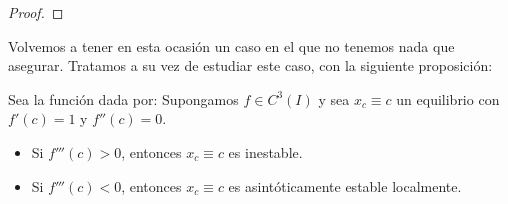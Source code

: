 \begin{proof}
\begin{comment}
        Como $f''$ es continua, $\exists \delta_1\in \bb{R}^+$ tal que si $|x-c|<\delta_1$, entonces $f''(x)>0$. Por tanto, usando que $f''$ mide el crecimiento de $f'$ y que $f'$ es continua, tenemos que $\exists \delta_2\in \bb{R}^+$, $\delta_2<\delta_1$, tal que:
        \begin{itemize}
            \item $|x-c|<\delta_2$, $x<c$, entonces $f'(x)<1$.
            \item $|x-c|<\delta_2$, $x>c$, entonces $f'(x)>1$.
        \end{itemize}
    \end{itemize}
    \end{comment}
\end{proof}

Volvemos a tener en esta ocasión un caso en el que no tenemos nada que asegurar. Tratamos a su vez de estudiar este caso, con la siguiente proposición:
\begin{prop}
    Sea la función dada por:
    Supongamos $f \in C^3 (I)$ y sea $x_c \equiv c$ un equilibrio con $f'(c) = 1$ y $f''(c)=0$.
    \begin{itemize}
        \item Si $f'''(c) > 0$, entonces $x_c \equiv c$ es inestable.
        \item Si $f'''(c) < 0$, entonces $x_c \equiv c$ es asintóticamente estable localmente.
    \end{itemize}
\end{prop}
